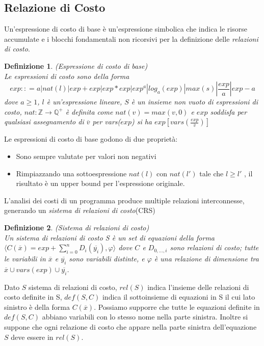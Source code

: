 \documentclass[../../main.tex]{subfiles}
\begin{document}
\subsection{Relazione di Costo} 
Un'espressione di costo di base è un'espressione simbolica che indica le risorse accumulate e i blocchi fondamentali non ricorsivi per la definizione delle \textit{relazioni di costo}.
\newtheorem{definition}{Definizione}
\begin{definition}(Espressione di costo di base)\\
Le espressioni di costo sono della forma $$exp :: = a | nat(l) | exp + exp | exp * exp |exp^a |log _a (exp) | max(s) | \frac{exp}{a} | exp - a   $$
dove $a \geq 1$, $l$ è un'espressione lineare, $S$ è un insieme non vuoto di espressioni di costo, $nat : \mathbb{Z}  \rightarrow \mathbb{Q} ^+$ è definita come $nat(v) = max({v,0})$ e $exp$ soddisfa per qualsiasi assegnamento di $\overline{v}$ per vars($exp$) si ha $exp[ vars(\frac{exp}{\overline{v}})]$
\end{definition}

Le espressioni di costo di base godono di due proprietà:
\begin{itemize}
    \item Sono sempre valutate per valori non negativi
    \item Rimpiazzando una sottoespressione $nat(l)$ con $nat(l')$ tale che $l \geq l'$ , il risultato è un upper bound per l'espressione originale.
\end{itemize}
L'analisi dei costi di un programma produce multiple relazioni interconnesse, generando un \textit{sistema di relazioni di costo}(CRS)

\begin{definition}(Sistema di relazioni di costo)\\
    Un sistema di relazioni di costo S è un set di equazioni della forma $\langle C(\overline{x}) = exp + \sum_{i = 0}^n D_i(\overline{y_i}), \varphi \rangle$  dove $C$ e $D_{0,\dots, i}$ sono relazioni di costo; tutte le variabili in $\overline{x}$ e $\overline{y_i}$ sono variabili distinte, e $\varphi$ è una relazione di dimensione tra  $\overline{x} \cup vars(exp) \cup \overline{y_i}$.
\end{definition}

Dato $S$ sistema di relazioni di costo, $rel(S)$ indica l'insieme delle relazioni di costo definite in S, $def(S,C)$ indica il sottoinsieme di equazioni in S il cui lato sinistro è della forma $C(\overline{x})$.
Possiamo supporre che tutte le equazioni definite in $def(S,C)$ abbiano variabili con lo stesso nome nella parte sinistra.
Inoltre si suppone che ogni relazione di costo che appare nella parte sinistra dell'equazione $S$ deve essere in $rel(S)$.
\end{document}
